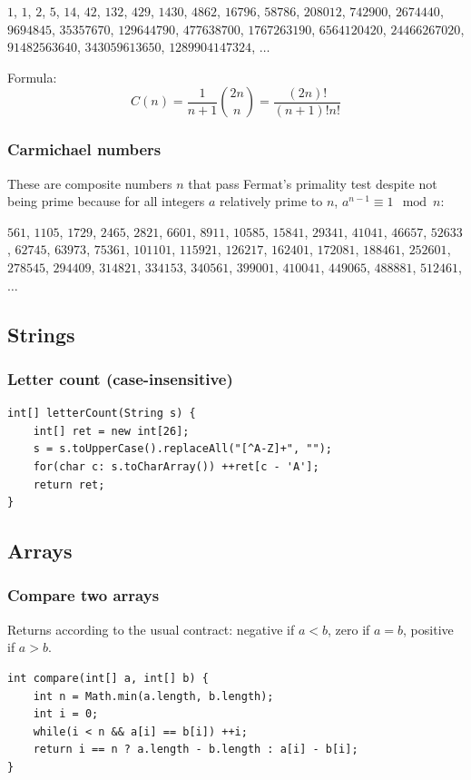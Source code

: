 \documentclass[a4paper,12pt]{article}
\begin{document}
\begin{center}$1$, $1$, $2$, $5$, $14$, $42$, $132$, $429$, $1430$, $4862$, $16796$, $58786$, $208012$, $742900$, $2674440$, $9694845$, $35357670$, $129644790$, $477638700$, $1767263190$, $6564120420$, $24466267020$, $91482563640$, $343059613650$, $1289904147324$, $\ldots$\end{center}

\noindent Formula:
\[C(n)=\frac{1}{n+1}{2n\choose n} = \frac{(2n)!}{(n+1)!n!}\]

\subsubsection{Carmichael numbers}
These are composite numbers $n$ that pass Fermat's primality test despite not being prime because for all integers $a$ relatively prime to $n$, $a^{n-1}\equiv 1 \mod{n}$:

\begin{center}$561$, $1105$, $1729$, $2465$, $2821$, $6601$, $8911$, $10585$, $15841$, $29341$, $41041$, $46657$, $52633$, $62745$, $63973$, $75361$, $101101$, $115921$, $126217$, $162401$, $172081$, $188461$, $252601$, $278545$, $294409$, $314821$, $334153$, $340561$, $399001$, $410041$, $449065$, $488881$, $512461$, $\ldots$\end{center}

\subsection{Strings}
\subsubsection{Letter count (case-insensitive)}
\begin{lstlisting}
int[] letterCount(String s) {
	int[] ret = new int[26];
	s = s.toUpperCase().replaceAll("[^A-Z]+", "");
	for(char c: s.toCharArray()) ++ret[c - 'A'];
	return ret;
}
\end{lstlisting}

\subsection{Arrays}
\subsubsection{Compare two arrays}
Returns according to the usual contract: negative if $a<b$, zero if $a=b$, positive if $a>b$.
\begin{lstlisting}
int compare(int[] a, int[] b) {
	int n = Math.min(a.length, b.length);
	int i = 0;
	while(i < n && a[i] == b[i]) ++i;
	return i == n ? a.length - b.length : a[i] - b[i];
}
\end{lstlisting}
\end{document}
